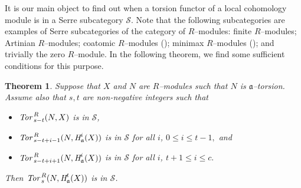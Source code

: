 \documentclass[10pt]{amsart}
\newtheorem{thm}{Theorem}[section]
\newcommand{\Tor}{\mbox{Tor}\,}
\renewcommand{\H}{\mbox{H}}
\newcommand{\fa}{\mathfrak{a}}
\begin{document}



It is our main object to find out when a torsion functor of a local cohomology module
is in a Serre subcategory $\mathcal{S}$. Note that the following subcategories are examples of
Serre subcategories of the category of $R$--modules:
finite $R$--modules; Artinian $R$--modules; coatomic $R$--modules (\cite {Z2}); minimax $R$--modules (\cite {Z}); and
trivially the zero $R$--module. In the following theorem, we find some sufficient conditions for
this purpose.

\begin{thm} \label {2-2} Suppose that $X$ and $N$ are $R$--modules such that $N$ is $\fa$--torsion.
Assume also that $s, t$ are non-negative integers such that
               \begin{itemize}
                   \item[(i)]{$\emph{\Tor}^{R}_{s- t}(N, X)$ is in $\mathcal{S}$,}
                   \item[(ii)]{$\emph{\Tor}^{R}_{s- t+ i- 1}(N, \emph{\H}^{i}_{\fa}(X))$ is in
                   $\mathcal{S}$ for all $i$, $0\leq i\leq t- 1,$ and}
                   \item[(iii)]{$\emph{\Tor}^{R}_{s- t+ i +1}(N, \emph{\H}^{i}_{\fa}(X))$ is in
                   $\mathcal{S}$ for all $i$, $t+ 1\leq i\leq c.$}
               \end{itemize}
Then $\emph{\Tor}^{R}_{s}(N, \emph{\H}^{t}_{\fa}(X))$ is in
$\mathcal{S}$.
\end{thm}
\end{document}
